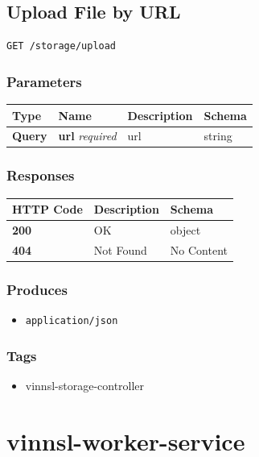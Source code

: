 \subsection{Upload File by URL}\label{upload-file-by-url}

\begin{verbatim}
GET /storage/upload
\end{verbatim}

\subsubsection{Parameters}\label{parameters-19}

\begin{longtable}[]{@{}llll@{}}
\toprule
Type & Name & Description & Schema\tabularnewline
\midrule
\endhead
\textbf{Query} & \textbf{url} \emph{required} & url &
string\tabularnewline
\bottomrule
\end{longtable}

\subsubsection{Responses}\label{responses-22}

\begin{longtable}[]{@{}lll@{}}
\toprule
HTTP Code & Description & Schema\tabularnewline
\midrule
\endhead
\textbf{200} & OK & object\tabularnewline
\textbf{404} & Not Found & No Content\tabularnewline
\bottomrule
\end{longtable}

\subsubsection{Produces}\label{produces-22}

\begin{itemize}
\tightlist
\item
  \texttt{application/json}
\end{itemize}

\subsubsection{Tags}\label{tags-22}

\begin{itemize}
\tightlist
\item
  vinnsl-storage-controller
\end{itemize}

\section{vinnsl-worker-service}\label{vinnsl-worker-service-1}

